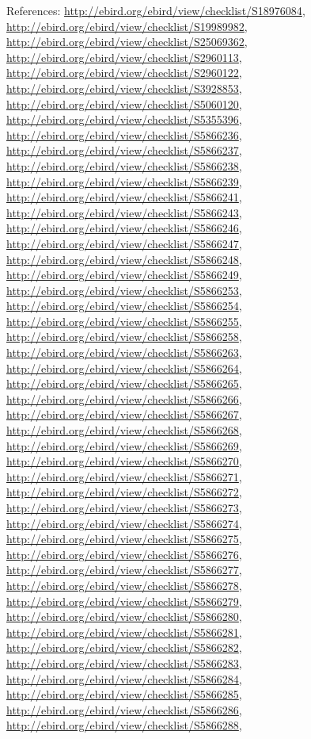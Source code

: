 \documentclass[9pt, article]{memoir}
\begin{document}
\begin{multicols}{2}
\vspace{6pt}References: 
\url{http://ebird.org/ebird/view/checklist/S18976084}, 
\url{http://ebird.org/ebird/view/checklist/S19989982}, 
\url{http://ebird.org/ebird/view/checklist/S25069362}, 
\url{http://ebird.org/ebird/view/checklist/S2960113}, 
\url{http://ebird.org/ebird/view/checklist/S2960122}, 
\url{http://ebird.org/ebird/view/checklist/S3928853}, 
\url{http://ebird.org/ebird/view/checklist/S5060120}, 
\url{http://ebird.org/ebird/view/checklist/S5355396}, 
\url{http://ebird.org/ebird/view/checklist/S5866236}, 
\url{http://ebird.org/ebird/view/checklist/S5866237}, 
\url{http://ebird.org/ebird/view/checklist/S5866238}, 
\url{http://ebird.org/ebird/view/checklist/S5866239}, 
\url{http://ebird.org/ebird/view/checklist/S5866241}, 
\url{http://ebird.org/ebird/view/checklist/S5866243}, 
\url{http://ebird.org/ebird/view/checklist/S5866246}, 
\url{http://ebird.org/ebird/view/checklist/S5866247}, 
\url{http://ebird.org/ebird/view/checklist/S5866248}, 
\url{http://ebird.org/ebird/view/checklist/S5866249}, 
\url{http://ebird.org/ebird/view/checklist/S5866253}, 
\url{http://ebird.org/ebird/view/checklist/S5866254}, 
\url{http://ebird.org/ebird/view/checklist/S5866255}, 
\url{http://ebird.org/ebird/view/checklist/S5866258}, 
\url{http://ebird.org/ebird/view/checklist/S5866263}, 
\url{http://ebird.org/ebird/view/checklist/S5866264}, 
\url{http://ebird.org/ebird/view/checklist/S5866265}, 
\url{http://ebird.org/ebird/view/checklist/S5866266}, 
\url{http://ebird.org/ebird/view/checklist/S5866267}, 
\url{http://ebird.org/ebird/view/checklist/S5866268}, 
\url{http://ebird.org/ebird/view/checklist/S5866269}, 
\url{http://ebird.org/ebird/view/checklist/S5866270}, 
\url{http://ebird.org/ebird/view/checklist/S5866271}, 
\url{http://ebird.org/ebird/view/checklist/S5866272}, 
\url{http://ebird.org/ebird/view/checklist/S5866273}, 
\url{http://ebird.org/ebird/view/checklist/S5866274}, 
\url{http://ebird.org/ebird/view/checklist/S5866275}, 
\url{http://ebird.org/ebird/view/checklist/S5866276}, 
\url{http://ebird.org/ebird/view/checklist/S5866277}, 
\url{http://ebird.org/ebird/view/checklist/S5866278}, 
\url{http://ebird.org/ebird/view/checklist/S5866279}, 
\url{http://ebird.org/ebird/view/checklist/S5866280}, 
\url{http://ebird.org/ebird/view/checklist/S5866281}, 
\url{http://ebird.org/ebird/view/checklist/S5866282}, 
\url{http://ebird.org/ebird/view/checklist/S5866283}, 
\url{http://ebird.org/ebird/view/checklist/S5866284}, 
\url{http://ebird.org/ebird/view/checklist/S5866285}, 
\url{http://ebird.org/ebird/view/checklist/S5866286}, 
\url{http://ebird.org/ebird/view/checklist/S5866288}, 

\end{multicols}
\end{document}
